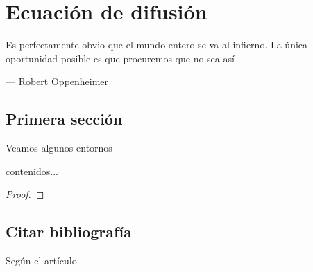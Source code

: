 {\justifying
	\chapter{Ecuación de difusión}
	\epigraph{Es perfectamente obvio que el mundo entero se va al
		infierno. La única oportunidad posible es que procuremos que
		no sea así}{--- \textup{Robert Oppenheimer}}
	\begin{abstract}
		\lipsum[1-2]
	\end{abstract}
	\section{Primera sección}
	Veamos algunos entornos
	\begin{definition}{}{}
		contenidos...
	\end{definition}
	\begin{lemma}{}{}
		\lipsum[1]
	\end{lemma}
	\begin{theorem}{}{}
		\lipsum[1]
	\end{theorem}
	\begin{corollary}{}{}
		\lipsum[1]
	\end{corollary}
	\begin{example}{}{}
		\lipsum[1]
	\end{example}
	\begin{proof}
		\lipsum
	\end{proof}
	\section{Citar bibliografía}
	Según el artículo \cite{bib:exampleReference}
	\putbib %
}
\cleanalldata